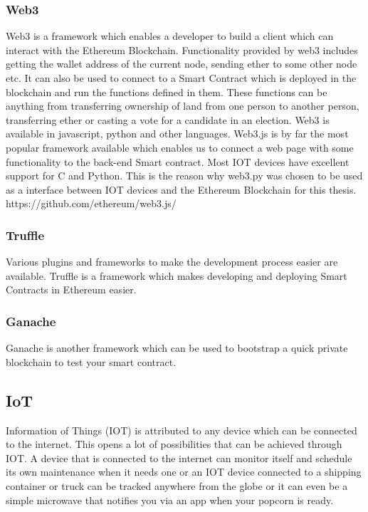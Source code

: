 \documentclass[11pt,openright]{report}
\begin{document}
\subsubsection{Web3}
Web3 is a framework which enables a developer to build a client which can interact with the Ethereum Blockchain. Functionality provided by web3 includes getting the wallet address of the current node, sending ether to some other node etc. It can also be used to connect to a Smart Contract which is deployed in the blockchain and run the functions defined in them. These functions can be anything from transferring ownership of land from one person to another person, transferring ether or casting a vote for a candidate in an election. Web3 is available in javascript, python and other languages. Web3.js is by far the most popular framework available which enables us to connect a web page with some functionality to the back-end Smart contract. Most IOT devices have excellent support for C and Python. This is the reason why web3.py was chosen to be used as a interface between IOT devices and the Ethereum Blockchain for this thesis.
https://github.com/ethereum/web3.js/

\subsubsection{Truffle}
Various plugins and frameworks to make the development process easier are available. Truffle is a framework which makes developing and deploying Smart Contracts in Ethereum easier.

\subsubsection{Ganache}
Ganache is another framework which can be used to bootstrap a quick private blockchain to test your smart contract.

\subsection{IoT}
Information of Things (IOT) is attributed to any device which can be connected to the internet. This opens a lot of possibilities that can be achieved through IOT. A device that is connected to the internet can monitor itself and schedule its own maintenance when it needs one or an IOT device connected to a shipping container or truck can be tracked anywhere from the globe or it can even be a simple microwave that notifies you via an app when your popcorn is ready.
\end{document}
